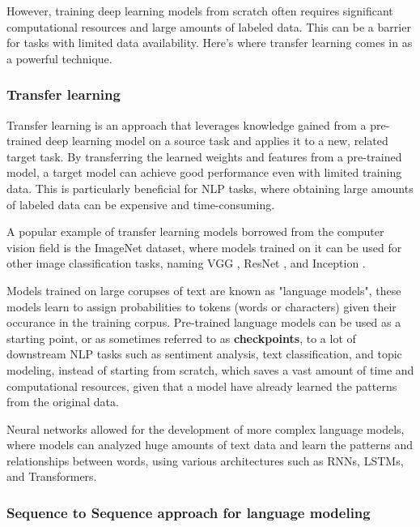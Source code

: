 \documentclass[12pt]{article}
\begin{document}
However, training deep learning models from scratch often requires significant computational resources and large amounts of labeled data. This can be a barrier for tasks with limited data availability. Here's where transfer learning comes in as a powerful technique.

\subsubsection{Transfer learning}

Transfer learning is an approach that leverages knowledge gained from a pre-trained deep learning model on a source task and applies it to a new, related target task. By transferring the learned weights and features from a pre-trained model, a target model can achieve good performance even with limited training data. This is particularly beneficial for NLP tasks, where obtaining large amounts of labeled data can be expensive and time-consuming.

A popular example of transfer learning models borrowed from the computer vision field is the ImageNet \cite{ILSVRC15} dataset, where models trained on it can be used for other image classification tasks, naming VGG \cite{Simonyan2014}, ResNet \cite{He2015}, and Inception \cite{Simonyan2014}.

Models trained on large corupses of text are known as "language models", these models learn to assign probabilities to tokens (words or characters) given their occurance in the training corpus. Pre-trained language models can be used as a starting point, or as sometimes referred to as \textbf{checkpoints}, to a lot of downstream NLP tasks such as sentiment analysis, text classification, and topic modeling, instead of starting from scratch, which saves a vast amount of time and computational resources, given that a model have already learned the patterns from the original data.

Neural networks allowed for the development of more complex language models, where models can analyzed huge amounts of text data and learn the patterns and relationships between words, using various architectures such as RNNs, LSTMs, and Transformers.

\subsubsection{Sequence to Sequence approach for language modeling}
\end{document}
